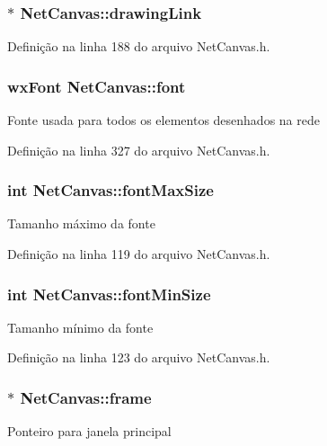 \subsubsection[{drawing\+Link}]{$\ast$ Net\+Canvas\+::drawing\+Link}\label{class_net_canvas_ae817e35e83d38897e65d8d6746c623dd}


Definição na linha 188 do arquivo Net\+Canvas.\+h.

\subsubsection[{font}]{\setlength{\rightskip}{0pt plus 5cm}wx\+Font Net\+Canvas\+::font\hspace{0.3cm}{\ttfamily [protected]}}\label{class_net_canvas_a00c7244881b5b91da19c5c1c0b8c1112}
Fonte usada para todos os elementos desenhados na rede 

Definição na linha 327 do arquivo Net\+Canvas.\+h.

\subsubsection[{font\+Max\+Size}]{\setlength{\rightskip}{0pt plus 5cm}int Net\+Canvas\+::font\+Max\+Size}\label{class_net_canvas_a3ea379432fdd0279365e1f608a9c491a}
Tamanho máximo da fonte 

Definição na linha 119 do arquivo Net\+Canvas.\+h.

\subsubsection[{font\+Min\+Size}]{\setlength{\rightskip}{0pt plus 5cm}int Net\+Canvas\+::font\+Min\+Size}\label{class_net_canvas_aa7dc6e689e1e1123b04670954765d225}
Tamanho mínimo da fonte 

Definição na linha 123 do arquivo Net\+Canvas.\+h.

\subsubsection[{frame}]{$\ast$ Net\+Canvas\+::frame\hspace{0.3cm}{\ttfamily [protected]}}\label{class_net_canvas_ad6205dc014494f621b44b33d3a0b3409}
Ponteiro para janela principal 

